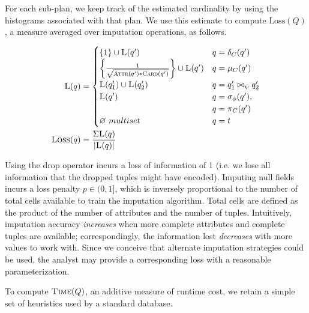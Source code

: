 For each sub-plan, we keep track of the estimated cardinality by using the histograms associated with
that plan. We use this estimate to compute $\text{Loss}(Q)$, a measure averaged over imputation operations, as follows.

\begin{align*}
  \textsc{L}(q) &= \begin{cases}
     \{1\} \cup \textsc{L}(q') & q = \delta_C(q') \\
    \left\{\frac{1}{\sqrt{ \textsc{Attr}(q') * \textsc{Card}(q')}}\right\} \cup \textsc{L}(q')  & q = \mu_C(q') \\
    \textsc{L}(q_1') \cup \textsc{L}(q_2') & q = q_1' \bowtie_\psi q_2' \\
    \textsc{L}(q') & q = \sigma_\phi(q'), \\ & q = \pi_C(q') \\
    \emptyset\ multiset & q = t\\
  \end{cases}\\
  \textsc{Loss}(q) &= \frac{\Sigma \textsc{L}(q)}{|\textsc{L}(q)|}
\end{align*}

Using the drop operator incurs a loss of information of 1 (i.e. we lose all information that
the dropped tuples might have encoded). Imputing null fields incurs a loss penalty $p \in (0, 1]$,
which is inversely proportional to the number of total cells available to train the imputation algorithm. 
Total cells are defined as the product of the number of attributes and the number of tuples.
Intuitively, imputation
accuracy \textit{increases} when more complete attributes and complete tuples are available;
correspondingly, the information lost \textit{decreases} with more values to work
with. Since we conceive that
alternate imputation strategies could be used, the analyst may provide a corresponding
loss with a reasonable parameterization.

To compute $\textsc{Time}(Q)$, an additive measure of runtime cost, we retain a simple set of heuristics used by a standard 
database. 


